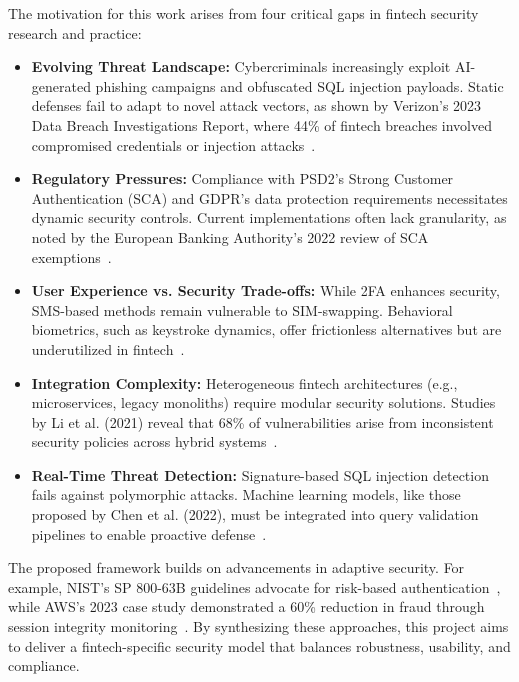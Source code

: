 The motivation for this work arises from four critical gaps in fintech security research and practice:

\begin{itemize}
\item \textbf{Evolving Threat Landscape:} Cybercriminals increasingly exploit AI-generated phishing campaigns and obfuscated SQL injection payloads. Static defenses fail to adapt to novel attack vectors, as shown by Verizon’s 2023 Data Breach Investigations Report, where 44\% of fintech breaches involved compromised credentials or injection attacks~\cite{verizon2023dbir}.
\item \textbf{Regulatory Pressures:} Compliance with PSD2’s Strong Customer Authentication (SCA) and GDPR’s data protection requirements necessitates dynamic security controls. Current implementations often lack granularity, as noted by the European Banking Authority’s 2022 review of SCA exemptions~\cite{euba2022sca}.  

\item \textbf{User Experience vs. Security Trade-offs:} While 2FA enhances security, SMS-based methods remain vulnerable to SIM-swapping. Behavioral biometrics, such as keystroke dynamics, offer frictionless alternatives but are underutilized in fintech~\cite{fridman2022biometric}.  

\item \textbf{Integration Complexity:} Heterogeneous fintech architectures (e.g., microservices, legacy monoliths) require modular security solutions. Studies by Li et al. (2021) reveal that 68\% of vulnerabilities arise from inconsistent security policies across hybrid systems~\cite{li2021hybrid}.  

\item \textbf{Real-Time Threat Detection:} Signature-based SQL injection detection fails against polymorphic attacks. Machine learning models, like those proposed by Chen et al. (2022), must be integrated into query validation pipelines to enable proactive defense~\cite{chen2022ml}.
\end{itemize}

The proposed framework builds on advancements in adaptive security. For example, NIST’s SP 800-63B guidelines advocate for risk-based authentication~\cite{nist2020digital}, while AWS’s 2023 case study demonstrated a 60\% reduction in fraud through session integrity monitoring~\cite{aws2023fraud}. By synthesizing these approaches, this project aims to deliver a fintech-specific security model that balances robustness, usability, and compliance.

